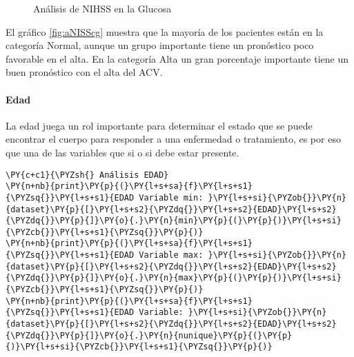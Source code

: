 \begin{center}
    	\begin{figure}[H]
	\centering
	\caption{Análisis de NIHSS en la Glucosa}
	\label{fig:aNISSg}
	\end{figure}
\end{center}
    
    El gráfico \ref{fig:aNISScg} muestra que la mayoría de los pacientes están en la categoría
Normal, aunque un grupo importante tiene un pronóstico poco favorable en
el alta. En la categoría Alta un gran porcentaje importante tiene un
buen pronóstico con el alta del ACV.

    \hypertarget{edad}{%
\paragraph{Edad}\label{edad}}

La edad juega un rol importante para determinar el estado que se puede
encontrar el cuerpo para responder a una enfermedad o tratamiento, es
por eso que una de las variables que si o si debe estar presente.

    \begin{tcolorbox}[breakable, size=fbox, boxrule=1pt, pad at break*=1mm,colback=cellbackground, colframe=cellborder]
\begin{Verbatim}[commandchars=\\\{\}]
\PY{c+c1}{\PYZsh{} Análisis EDAD}
\PY{n+nb}{print}\PY{p}{(}\PY{l+s+sa}{f}\PY{l+s+s1}{\PYZsq{}}\PY{l+s+s1}{EDAD Variable min: }\PY{l+s+si}{\PYZob{}}\PY{n}{dataset}\PY{p}{[}\PY{l+s+s2}{\PYZdq{}}\PY{l+s+s2}{EDAD}\PY{l+s+s2}{\PYZdq{}}\PY{p}{]}\PY{o}{.}\PY{n}{min}\PY{p}{(}\PY{p}{)}\PY{l+s+si}{\PYZcb{}}\PY{l+s+s1}{\PYZsq{}}\PY{p}{)}
\PY{n+nb}{print}\PY{p}{(}\PY{l+s+sa}{f}\PY{l+s+s1}{\PYZsq{}}\PY{l+s+s1}{EDAD Variable max: }\PY{l+s+si}{\PYZob{}}\PY{n}{dataset}\PY{p}{[}\PY{l+s+s2}{\PYZdq{}}\PY{l+s+s2}{EDAD}\PY{l+s+s2}{\PYZdq{}}\PY{p}{]}\PY{o}{.}\PY{n}{max}\PY{p}{(}\PY{p}{)}\PY{l+s+si}{\PYZcb{}}\PY{l+s+s1}{\PYZsq{}}\PY{p}{)}
\PY{n+nb}{print}\PY{p}{(}\PY{l+s+sa}{f}\PY{l+s+s1}{\PYZsq{}}\PY{l+s+s1}{EDAD Variable: }\PY{l+s+si}{\PYZob{}}\PY{n}{dataset}\PY{p}{[}\PY{l+s+s2}{\PYZdq{}}\PY{l+s+s2}{EDAD}\PY{l+s+s2}{\PYZdq{}}\PY{p}{]}\PY{o}{.}\PY{n}{nunique}\PY{p}{(}\PY{p}{)}\PY{l+s+si}{\PYZcb{}}\PY{l+s+s1}{\PYZsq{}}\PY{p}{)}
\end{Verbatim}
\end{tcolorbox}

